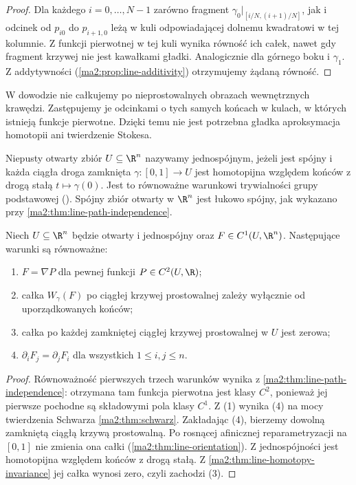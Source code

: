 \begin{proof}
Dla każdego $i=0,\ldots,N-1$ zarówno
fragment $\gamma_0|_{[i/N,(i+1)/N]}$,
jak i odcinek od $p_{i0}$ do $p_{i+1,0}$
leżą w kuli odpowiadającej dolnemu
kwadratowi w tej kolumnie.
Z funkcji pierwotnej w tej kuli wynika
równość ich całek, nawet gdy fragment
krzywej nie jest kawałkami gładki.
Analogicznie dla górnego boku
i $\gamma_1$. Z addytywności
(\ref{ma2:prop:line-additivity})
otrzymujemy żądaną równość.
\end{proof}

W dowodzie nie całkujemy po nieprostowalnych
obrazach wewnętrznych krawędzi.
Zastępujemy je odcinkami o tych samych końcach
w kulach, w których istnieją funkcje pierwotne.
Dzięki temu nie jest potrzebna gładka
aproksymacja homotopii ani twierdzenie Stokesa.

\begin{definicja}[Jednospójność]
\label{ma2:def:line-simply-connected}
Niepusty otwarty zbiór $U\subseteq\R^n$
nazywamy jednospójnym, jeżeli jest spójny
i każda ciągła droga zamknięta
$\gamma:[0,1]\to U$ jest homotopijna
względem końców z drogą stałą
$t\mapsto\gamma(0)$.
Jest to równoważne warunkowi trywialności
grupy podstawowej
().
Spójny zbiór otwarty w $\R^n$ jest łukowo
spójny, jak wykazano przy
\ref{ma2:thm:line-path-independence}.
\end{definicja}

\begin{twierdzenie}
\label{ma2:thm:line-simply-connected}
Niech $U\subseteq\R^n$ będzie otwarty
i jednospójny oraz $F\in C^1(U,\R^n)$.
Następujące warunki są równoważne:
\begin{enumerate}
 \item $F=\nabla P$ dla pewnej funkcji $P\in C^2(U,\R)$;
 \item całka $W_\gamma(F)$ po ciągłej krzywej
 prostowalnej zależy wyłącznie od uporządkowanych końców;
 \item całka po każdej zamkniętej ciągłej krzywej
 prostowalnej w $U$ jest zerowa;
 \item $\partial_iF_j=\partial_jF_i$ dla wszystkich
 $1\le i,j\le n$.
\end{enumerate}
\end{twierdzenie}
\begin{proof}
Równoważność pierwszych trzech warunków
wynika z \ref{ma2:thm:line-path-independence}:
otrzymana tam funkcja pierwotna jest klasy
$C^2$, ponieważ jej pierwsze pochodne
są składowymi pola klasy $C^1$.
Z (1) wynika (4) na mocy twierdzenia Schwarza
\ref{ma2:thm:schwarz}.
Zakładając (4), bierzemy dowolną zamkniętą
ciągłą krzywą prostowalną.
Po rosnącej afinicznej reparametryzacji
na $[0,1]$ nie zmienia ona całki
(\ref{ma2:thm:line-orientation}).
Z jednospójności jest homotopijna
względem końców z drogą stałą.
Z \ref{ma2:thm:line-homotopy-invariance}
jej całka wynosi zero, czyli zachodzi (3).
\end{proof}


